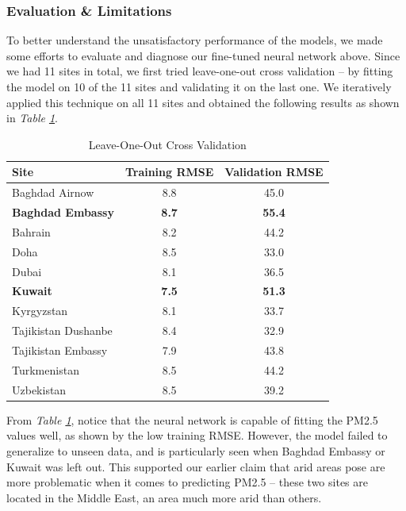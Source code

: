 \documentclass[draft]{agujournal2019}
\begin{document}
\subsubsection{Evaluation \& Limitations}

To better understand the unsatisfactory performance of the models, we made some efforts to evaluate and diagnose our fine-tuned neural network above. Since we had 11 sites in total, we first tried leave-one-out cross validation -- by fitting the model on 10 of the 11 sites and validating it on the last one. We iteratively applied this technique on all 11 sites and obtained the following results as shown in \textit{Table \ref{tab:loo-cv}}.

\begin{table}[htbp]
    \centering
    \begin{tabular}{l c c}
        \toprule
        \textbf{Site} & \textbf{Training RMSE} & \textbf{Validation RMSE} \\
        \midrule
        Baghdad Airnow & 8.8 & 45.0 \\
        \textbf{Baghdad Embassy} & \textbf{8.7} & \textbf{55.4} \\
        Bahrain & 8.2 & 44.2 \\
        Doha & 8.5 & 33.0 \\
        Dubai & 8.1 & 36.5 \\
        \textbf{Kuwait} & \textbf{7.5} & \textbf{51.3} \\
        Kyrgyzstan & 8.1 & 33.7 \\
        Tajikistan Dushanbe & 8.4 & 32.9 \\
        Tajikistan Embassy & 7.9 & 43.8 \\
        Turkmenistan & 8.5 & 44.2 \\
        Uzbekistan & 8.5 & 39.2 \\
        \bottomrule
    \end{tabular}
    \caption{Leave-One-Out Cross Validation}
    \label{tab:loo-cv}
\end{table}

From \textit{Table \ref{tab:loo-cv}}, notice that the neural network is capable of fitting the PM2.5 values well, as shown by the low training RMSE. However, the model failed to generalize to unseen data, and is particularly seen when Baghdad Embassy or Kuwait was left out. This supported our earlier claim that arid areas pose are more problematic when it comes to predicting PM2.5 -- these two sites are located in the Middle East, an area much more arid than others.
\end{document}
